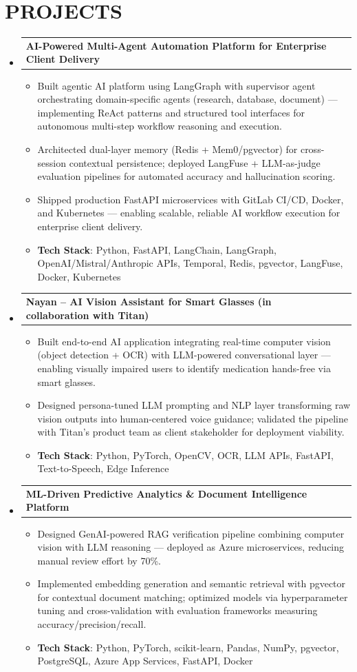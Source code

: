 \documentclass[letterpaper,10pt]{article}
\makeatletter
\newcommand{\resumeItem}[1]{
  \item\small{
    {#1 \vspace{-2pt}} 
  }
}
\newcommand{\resumeProjectHeading}[2]{
    \item
    \begin{tabular*}{\textwidth}{l@{\extracolsep{\fill}}r}
      #1 & {\color{dark-grey}} \\
    \end{tabular*}\vspace{-6pt} 
}
\newcommand{\resumeSubHeadingListStart}{\begin{itemize}[leftmargin=0in, label={}]}
\newcommand{\resumeSubHeadingListEnd}{\end{itemize}\vspace{-8pt}}
\newcommand{\resumeItemListStart}{\begin{itemize}}
\newcommand{\resumeItemListEnd}{\end{itemize}\vspace{-6pt}}
\makeatother
\begin{document}
\section{PROJECTS}
    \resumeSubHeadingListStart
      \resumeProjectHeading
          {\textbf{AI-Powered Multi-Agent Automation Platform for Enterprise Client Delivery}} {2025 -- Present}
          \resumeItemListStart
            \resumeItem{Built agentic AI platform using LangGraph with supervisor agent orchestrating domain-specific agents (research, database, document) — implementing ReAct patterns and structured tool interfaces for autonomous multi-step workflow reasoning and execution.}
            \resumeItem{Architected dual-layer memory (Redis + Mem0/pgvector) for cross-session contextual persistence; deployed LangFuse + LLM-as-judge evaluation pipelines for automated accuracy and hallucination scoring.}
            \resumeItem{Shipped production FastAPI microservices with GitLab CI/CD, Docker, and Kubernetes — enabling scalable, reliable AI workflow execution for enterprise client delivery.}
            \resumeItem{\textbf{Tech Stack}: Python, FastAPI, LangChain, LangGraph, OpenAI/Mistral/Anthropic APIs, Temporal, Redis, pgvector, LangFuse, Docker, Kubernetes}
          \resumeItemListEnd
    \resumeProjectHeading
    {\textbf{Nayan -- AI Vision Assistant for Smart Glasses (in collaboration with Titan)}} {2023 -- 2024}
    \resumeItemListStart
      \resumeItem{Built end-to-end AI application integrating real-time computer vision (object detection + OCR) with LLM-powered conversational layer — enabling visually impaired users to identify medication hands-free via smart glasses.}
      \resumeItem{Designed persona-tuned LLM prompting and NLP layer transforming raw vision outputs into human-centered voice guidance; validated the pipeline with Titan's product team as client stakeholder for deployment viability.}
      \resumeItem{\textbf{Tech Stack}: Python, PyTorch, OpenCV, OCR, LLM APIs, FastAPI, Text-to-Speech, Edge Inference}
    \resumeItemListEnd
      \resumeProjectHeading
          {\textbf{ML-Driven Predictive Analytics \& Document Intelligence Platform}} {2023 -- 2024}
          \resumeItemListStart
            \resumeItem{Designed GenAI-powered RAG verification pipeline combining computer vision with LLM reasoning — deployed as Azure microservices, reducing manual review effort by 70\%.}
            \resumeItem{Implemented embedding generation and semantic retrieval with pgvector for contextual document matching; optimized models via hyperparameter tuning and cross-validation with evaluation frameworks measuring accuracy/precision/recall.}
            \resumeItem{\textbf{Tech Stack}: Python, PyTorch, scikit-learn, Pandas, NumPy, pgvector, PostgreSQL, Azure App Services, FastAPI, Docker}
          \resumeItemListEnd
    \resumeSubHeadingListEnd
\end{document}
